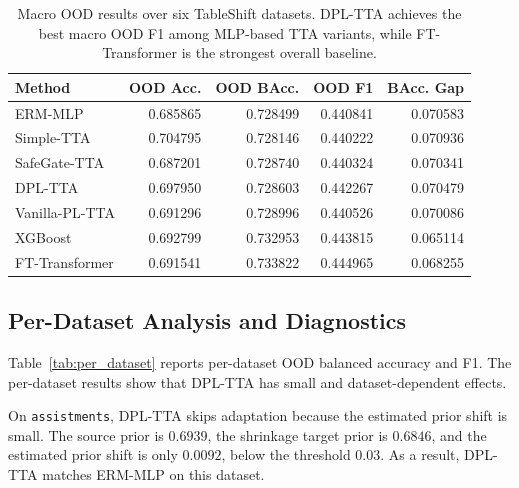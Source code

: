 \begin{table}[t]
\centering
\caption{Macro OOD results over six TableShift datasets. DPL-TTA achieves the best macro OOD F1 among MLP-based TTA variants, while FT-Transformer is the strongest overall baseline.}
\label{tab:main_results}
\begin{tabular}{lrrrr}
\toprule
Method & OOD Acc. & OOD BAcc. & OOD F1 & BAcc. Gap \\
\midrule
ERM-MLP        & 0.685865 & 0.728499 & 0.440841 & 0.070583 \\
Simple-TTA     & 0.704795 & 0.728146 & 0.440222 & 0.070936 \\
SafeGate-TTA   & 0.687201 & 0.728740 & 0.440324 & 0.070341 \\
DPL-TTA        & 0.697950 & 0.728603 & 0.442267 & 0.070479 \\
Vanilla-PL-TTA & 0.691296 & 0.728996 & 0.440526 & 0.070086 \\
XGBoost        & 0.692799 & 0.732953 & 0.443815 & 0.065114 \\
FT-Transformer & 0.691541 & 0.733822 & 0.444965 & 0.068255 \\
\bottomrule
\end{tabular}
\end{table}



\subsection{Per-Dataset Analysis and Diagnostics}

Table~\ref{tab:per_dataset} reports per-dataset OOD balanced accuracy and F1. The per-dataset results show that DPL-TTA has small and dataset-dependent effects.

On \texttt{assistments}, DPL-TTA skips adaptation because the estimated prior shift is small. The source prior is $0.6939$, the shrinkage target prior is $0.6846$, and the estimated prior shift is only $0.0092$, below the threshold $0.03$. As a result, DPL-TTA matches ERM-MLP on this dataset.

